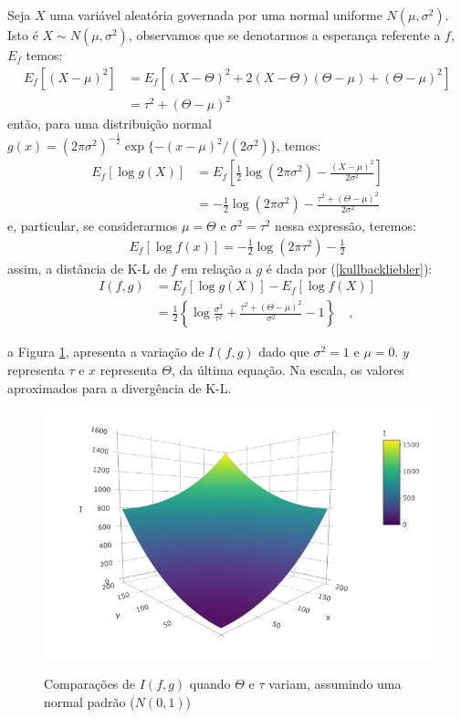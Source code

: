 Seja $X$ uma variável aleatória governada por uma normal uniforme $N(\mu, \sigma^2)$. Isto é $X \sim N(\mu, \sigma^2)$, observamos que se denotarmos a esperança referente a $f$, $E_f$ temos: 
\begin{align*}
    E_f[(X - \mu)^2] &= E_f[(X - \Theta)^2 + 2(X - \Theta)(\Theta - \mu) + (\Theta - \mu)^2]\\
                     &= \tau^2 + (\Theta - \mu)^2
\end{align*}
então, para uma distribuição normal $g(x) = (2\pi\sigma^2)^{-\frac{1}{2}}\exp\{-(x - \mu)^2 / (2\sigma^2)\}$, temos:
\begin{align*}
    E_f[\log g(X)] &= E_f\left[\frac{1}{2}\log(2\pi\sigma^2)-\frac{(X-\mu)^2}{2\sigma^2}\right]\\
                   &= -\frac{1}{2}\log(2\pi\sigma^2) - \frac{\tau^2 + (\Theta - \mu)^2}{2\sigma^2}
\end{align*}
e, particular, se considerarmos $\mu = \Theta$ e $\sigma^2 = \tau^2$ nessa expressão, teremos:
\begin{align*}
    E_f[\log f(x)] = -\frac{1}{2}\log(2\pi\tau^2) - \frac{1}{2}
\end{align*}
assim, a distância de K-L de $f$ em relação a $g$ é dada por (\ref{kullbackliebler}):
\begin{align*}
    I(f,g) &= E_f[\log g(X)] - E_f[\log f(X)]\\
           &= \frac{1}{2}\left\{\log\frac{\sigma^2}{\tau^2} + \frac{\tau^2 + (\Theta - \mu)^2}{\sigma^2} - 1 \right\} \quad ,
\end{align*}

\noindent
a Figura \ref{fig:normal}, apresenta a variação de $I(f,g)$ dado que $\sigma^2 = 1$ e $\mu = 0$. $y$ representa $\tau$ e $x$ representa $\Theta$, da última equação. Na escala, os valores aproximados para a divergência de K-L.

\begin{figure}[!h]
    \centering
    \caption{Comparações de $I(f,g)$ quando $\Theta$ e $\tau$ variam, assumindo uma normal padrão ($N(0, 1)$)}
    \includegraphics[width=.8\textwidth]{capitulos/figures/plot3d.png}
    \label{fig:normal}
\end{figure}

